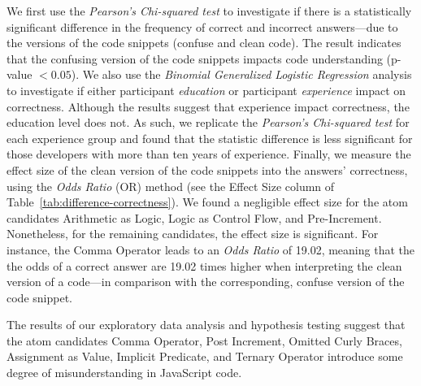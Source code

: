 We first use the \emph{Pearson's Chi-squared test}
to investigate if there is a statistically significant difference
in the frequency of correct and incorrect answers---due to the versions
of the code snippets (confuse and clean code). The result indicates that the confusing version of the code snippets impacts code understanding (p-value $< 0.05$). We also use the \emph{Binomial Generalized Logistic Regression} analysis to investigate if either participant
\emph{education} or participant \emph{experience} impact on correctness. Although the results suggest that experience impact correctness, the education level does not. As such, we replicate the \emph{Pearson's Chi-squared test} for each experience group and found that the statistic difference is less significant for those developers with more than ten years of experience.
Finally, we measure the effect size of the clean version of the code snippets into the answers' correctness, using the \emph{Odds Ratio} (OR)
method (see the Effect Size column of Table~\ref{tab:difference-correctness}). We found a negligible effect size for the atom candidates Arithmetic as Logic, Logic as Control Flow, and
Pre-Increment. Nonetheless, for the remaining candidates, the effect size is significant. For instance, the Comma Operator leads to an \emph{Odds Ratio} of
\num{19.02}, meaning that the the odds of a correct answer are \num{19.02} times
higher when interpreting the clean version of a code---in comparison with the corresponding, confuse version of the code snippet.

\begin{mh}
  The results of our exploratory data analysis and
  hypothesis testing suggest that the atom
  candidates Comma Operator, Post Increment,
  Omitted Curly Braces, Assignment as Value,
  Implicit Predicate, and Ternary Operator
  introduce some degree of misunderstanding
  in JavaScript code. 
\end{mh}


